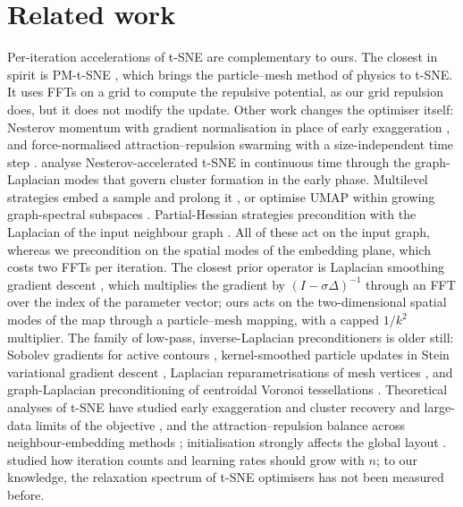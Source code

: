 \documentclass[11pt]{article}
\begin{document}
\section{Related work}
Per-iteration accelerations of t-SNE \citep{vandermaaten2014bh,linderman2019fitsne,pezzotti2020gpgpu,
chan2019tsnecuda} are complementary to ours. The closest in spirit is PM-t-SNE \citep{delchevalerie2021pm},
which brings the particle--mesh method of physics to t-SNE. It uses FFTs on a grid to compute the repulsive
potential, as our grid repulsion does, but it does not modify the update. Other work changes the optimiser
itself: Nesterov momentum with gradient normalisation in place of early exaggeration
\citep{lambert2023nesterov}, and force-normalised attraction--repulsion swarming with a size-independent time
step \citep{lu2024swarming}. \citet{iwasaki2025accelerated} analyse Nesterov-accelerated t-SNE in continuous
time through the graph-Laplacian modes that govern cluster formation in the early phase. Multilevel
strategies embed a sample and prolong it \citep{skrodzki2023perplexity}, or optimise UMAP within growing
graph-spectral subspaces \citep{spectral2026multiscale}. Partial-Hessian strategies precondition with the
Laplacian of the input neighbour graph \citep{vladymyrov2012}. All of these act on the input graph, whereas
we precondition on the spatial modes of the embedding plane, which costs two FFTs per iteration. The closest
prior operator is Laplacian smoothing gradient descent \citep{osher2022lsgd}, which multiplies the gradient by
$(I-\sigma\Delta)^{-1}$ through an FFT over the index of the parameter vector; ours acts on the two-dimensional
spatial modes of the map through a particle--mesh mapping, with a capped $1/k^2$ multiplier. The family of low-pass,
inverse-Laplacian preconditioners is older still:
Sobolev gradients for active contours \citep{sundaramoorthi2007}, kernel-smoothed particle updates in Stein
variational gradient descent \citep{liu2016svgd}, Laplacian reparametrisations of mesh vertices
\citep{nicolet2021largesteps}, and graph-Laplacian preconditioning of centroidal Voronoi tessellations
\citep{hateley2015cvt}. Theoretical analyses of t-SNE have studied early exaggeration and cluster recovery
\citep{linderman2019provably,arora2018analysis,cai2022foundations} and large-data limits of the objective
\citep{murray2024limits}, and the attraction--repulsion balance across neighbour-embedding methods
\citep{boehm2022attraction}; initialisation strongly affects the global layout \citep{kobak2021initialization}.
\citet{belkina2019} studied how iteration counts and learning rates should grow with $n$; to our knowledge, the
relaxation spectrum of t-SNE optimisers has not been measured before.
\end{document}
